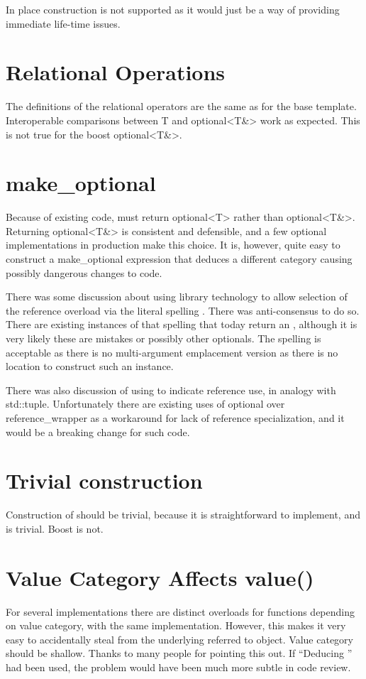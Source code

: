\documentclass[a4paper,10pt,oneside,openany,final,article]{memoir}
\begin{document}
In place construction is not supported as it would just be a way of providing immediate life-time issues.

\section{Relational Operations}

The definitions of the relational operators are the same as for the base template. Interoperable comparisons between T and optional<T\&> work as expected. This is not true for the boost optional<T\&>.

\section{make_optional}
Because of existing code,  must return optional<T> rather than optional<T\&>. Returning optional<T\&> is consistent and defensible, and a few optional implementations in production make this choice. It is, however, quite easy to construct a make_optional expression that deduces a different category causing possibly dangerous changes to code.

There was some discussion about using library technology to allow selection of the reference overload via the literal spelling . There was anti-consensus to do so. There are existing instances of that spelling that today return an , although it is very likely these are mistakes or possibly other optionals. The spelling  is acceptable as there is no multi-argument emplacement version as there is no location to construct such an instance.

There was also discussion of using  to indicate reference use, in analogy with std::tuple. Unfortunately there are existing uses of optional over reference_wrapper as a workaround for lack of reference specialization, and it would be a breaking change for such code.

\section{Trivial construction}
Construction of  should be trivial, because it is straightforward to implement, and  is trivial. Boost is not.

\section{Value Category Affects value()}
For several implementations there are distinct overloads for functions depending on value category, with the same implementation. However, this makes it very easy to accidentally steal from the underlying referred to object. Value category should be shallow. Thanks to many people for pointing this out. If ``Deducing '' had been used, the problem would have been much more subtle in code review.
\end{document}
